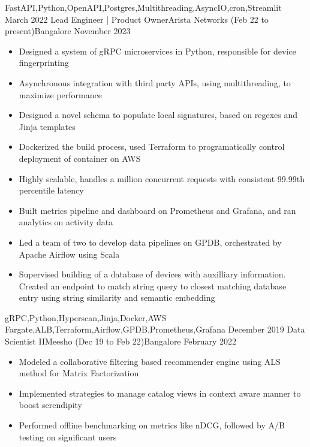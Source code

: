 \begin{experiences}
{                    }
                    {FastAPI,Python,OpenAPI,Postgres,Multithreading,AsyncIO,cron,Streamlit}
  \emptySeparator
  \experience
    {March 2022}    {Lead Engineer | Product Owner}{Arista Networks (Feb 22 to present)}{Bangalore}
    {November 2023} {
                      \begin{itemize}
                        \item Designed a system of gRPC microservices in Python, responsible for device fingerprinting 
                        \item Asynchronous integration with third party APIs, using multithreading, to maximize performance
                        \item Designed a novel schema to populate local signatures, based on regexes and Jinja templates
                        \item Dockerized the build process, used Terraform to programatically control deployment of container on AWS
                        \item Highly scalable, handles a million concurrent requests with consistent 99.99th percentile latency
                        \item Built metrics pipeline and dashboard on Prometheus and Grafana, and ran analytics on activity data
                        \item Led a team of two to develop data pipelines on GPDB, orchestrated by Apache Airflow using Scala
                        \item Supervised building of a database of devices with auxilliary information. Created an endpoint to match string query to closest matching database entry using string similarity and semantic embedding
                      \end{itemize}
                    }
                    {gRPC,Python,Hyperscan,Jinja,Docker,AWS Fargate,ALB,Terraform,Airflow,GPDB,Prometheus,Grafana}
  \emptySeparator
  \experience
    {December 2019} {Data Scientist II}{Meesho (Dec 19 to Feb 22)}{Bangalore}
    {February 2022} {
                      \begin{itemize}
                        \item Modeled a collaborative filtering based recommender engine using ALS method for Matrix Factorization
                        \item Implemented strategies to manage catalog views in context aware manner to boost serendipity
                        \item Performed offline benchmarking on metrics like nDCG, followed by A/B testing on significant users

\end{itemize}}
\end{experiences}
